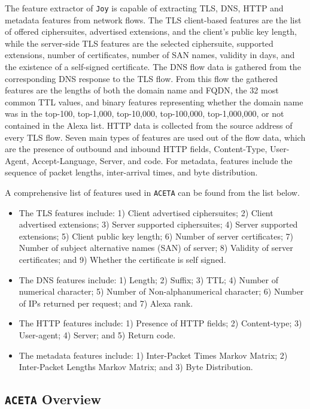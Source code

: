 The feature extractor of \texttt{Joy} is capable of extracting TLS, DNS, HTTP and metadata features from network flows. The TLS client-based features are the list of offered ciphersuites, advertised extensions, and the client's public key length, while the server-side TLS features are the selected ciphersuite, supported extensions, number of certificates, number of SAN names, validity in days, and the existence of a self-signed certificate. The DNS flow data is gathered from the corresponding DNS response to the TLS flow. From this flow the gathered features are the lengths of both the domain name and FQDN, the 32 most common TTL values, and binary features representing whether the domain name was in the top-100, top-1,000, top-10,000, top-100,000, top-1,000,000, or not contained in the Alexa list. HTTP data is collected from the source address of every TLS flow. Seven main types of features are used out of the flow data, which are the presence of outbound and inbound HTTP fields, Content-Type, User-Agent, Accept-Language, Server, and code. For metadata, features include the sequence of packet lengths, inter-arrival times, and byte distribution. 

A comprehensive list of features used in \texttt{ACETA} can be found from the list below.

\begin{itemize}
	\item
	The TLS features include:
	1) Client advertised ciphersuites;
	2) Client advertised extensions;
	3) Server supported ciphersuites;
	4) Server supported extensions;
	5) Client public key length;
	6) Number of server certificates;
	7) Number of subject alternative names (SAN) of server;
	8) Validity of server certificates; and
	9) Whether the certificate is self signed.
	\item
	The DNS features include: 
	1) Length;
	2) Suffix;
	3) TTL;
	4) Number of numerical character;
	5) Number of Non-alphanumerical character;
	6) Number of IPs returned per request; and
	7) Alexa rank.
	\item
	The HTTP features include:
	1) Presence of HTTP fields;
	2) Content-type;
	3) User-agent;
	4) Server; and
	5) Return code.
	
	\item
	The metadata features include: 
	1) Inter-Packet Times Markov Matrix;
	2) Inter-Packet Lengths Markov Matrix; and
	3) Byte Distribution.
\end{itemize}

\subsection{\texttt{ACETA} Overview}

